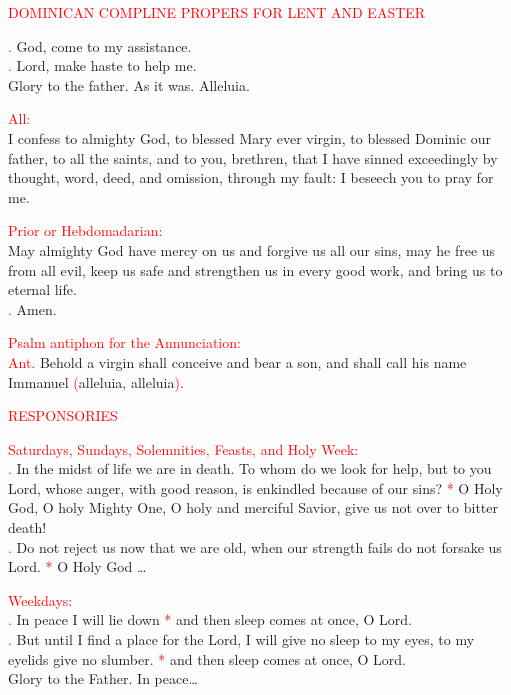 \documentclass[10pt]{article}
\makeatletter
\DeclareRobustCommand{\versicle}{\vers@resp{-0.1em}{V}}
\DeclareRobustCommand{\response}{\vers@resp{0pt}{R}}
\newcommand{\vers@resp@sym}{\raisebox{0.2ex}{\rotatebox[origin=c]{-20}{$\m@th\rceil$}}}
\newcommand{\vers@resp}[2]{%
  {\ooalign{\hidewidth\kern#1\vers@resp@sym\hidewidth\cr#2\cr}}%
}
\makeatother
\begin{document}
\setlength{\parindent}{0pt}
\textcolor{red}{DOMINICAN COMPLINE PROPERS FOR LENT AND EASTER}


\textcolor{red}{\versicle.} God, come to my assistance. \\
\textcolor{red}{\response.} Lord, make haste to help me. \\
Glory to the father.  As it was.  Alleluia.

\textcolor{red}{All:} \\
I confess to almighty God, 
to blessed Mary ever virgin, 
to blessed Dominic our father, 
to all the saints, and to you, brethren,
that I have sinned exceedingly
by thought, word, deed, and omission, through my fault:
I beseech you to pray for me.

\textcolor{red}{Prior or Hebdomadarian:}\\
May almighty God have mercy on us
and forgive us all our sins,
may he free us from all evil,
keep us safe and strengthen us in every good work,
and bring us to eternal life.\\
\textcolor{red}{\response.} Amen.

\textcolor{red}{Psalm antiphon for the Annunciation:}\\
\textcolor{red}{Ant.} Behold a virgin shall conceive and bear a son, and shall call his name Immanuel \textcolor{red}{(}alleluia, alleluia\textcolor{red}{)}.

\textcolor{red}{RESPONSORIES}

\textcolor{red}{Saturdays, Sundays, Solemnities, Feasts, and Holy Week:} \\
\textcolor{red}{\response.} In the midst of life we are in death.  
To whom do we look for help, but to you Lord, whose anger, with good reason, 
is enkindled because of our sins?
\textcolor{red}{*} O Holy God, O holy Mighty One, O holy and merciful Savior, give us not over to bitter death! \\
\textcolor{red}{\versicle.} Do not reject us now that we are old, when our strength fails do not forsake us Lord.
\textcolor{red}{*} O Holy God \dots

\textcolor{red}{Weekdays:} \\
\textcolor{red}{\response.} In peace I will lie down
\textcolor{red}{*} and then sleep comes at once, O Lord.\\
\textcolor{red}{\versicle.} But until I find a place for the Lord, I will give no sleep to my eyes, to my eyelids give no slumber.
\textcolor{red}{*} and then sleep comes at once, O Lord.\\
Glory to the Father.  In peace\dots
\end{document}

